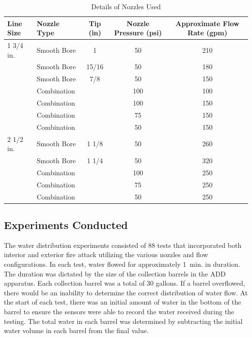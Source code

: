 \documentclass{article}
\begin{document}
\begin{table}[!ht]
\centering
\caption{Details of Nozzles Used}
\label{tab:nozzles_used_detail}
\begin{tabular}{llccc}
\toprule[1.5pt]
{{Line Size}} & {{Nozzle Type}} & {{Tip (in)}} & {{Nozzle Pressure (psi)}} & {Approximate Flow Rate (gpm)} \\ 
\midrule
1 3/4 in. & Smooth Bore          & 1      & 50 & 210 \\
          & Smooth Bore          & 15/16  & 50 & 180 \\
          & Smooth Bore          & 7/8    & 50 & 150 \\
          & Combination          &        & 100 & 100 \\
          & Combination          &        & 100 & 150 \\
          & Combination          &        & 75 & 150 \\
          & Combination          &        & 50 & 150 \\ \midrule
2 1/2 in. & Smooth Bore          & 1 1/8  & 50 & 260 \\
          & Smooth Bore          & 1 1/4  & 50 & 320 \\
          & Combination          &        & 100 & 250 \\
          & Combination          &        & 75 & 250 \\
          & Combination          &        & 50 & 250 \\
\bottomrule[1.25pt]
\end{tabular}
\end{table}

\subsection{Experiments Conducted}

The water distribution experiments consisted of 88 tests that incorporated both interior and exterior fire attack utilizing the various nozzles and flow configurations. In each test, water flowed for approximately 1~min. in duration. The duration was dictated by the size of the collection barrels in the ADD apparatus. Each collection barrel was a total of 30 gallons. If a barrel overflowed, there would be an inability to determine the correct distribution of water flow. At the start of each test, there was an initial amount of water in the bottom of the barrel to ensure the sensors were able to record the water received during the testing. The total water in each barrel was determined by subtracting the initial water volume in each barrel from the final value. 
\end{document}
